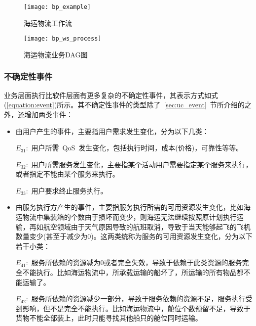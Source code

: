 \begin{figure}[htbp]
    \centering
    \texttt{[image: bp\_example]}
    \caption{海运物流工作流}\label{figure:bp_example}
    \vspace{-1em}
\end{figure}

\begin{figure}[htbp]
    \centering
    \texttt{[image: bp\_ws\_process]}
    \caption{海运物流业务DAG图}\label{figure:bp_ws_process}
    \vspace{-1em}
\end{figure}

\subsubsection{不确定性事件} \label{sec:uc_bp}

业务层面执行比软件层面有更多复杂的不确定性事件，其表示方式如式(\ref{equation:event})所示。其不确定性事件的类型除了~\ref{sec:uc_event}~节所介绍的之外，还增加两类事件：

\begin{itemize}
    
    \item 由用户产生的事件，主要指用户需求发生变化，分为以下几类：
    
    $E_{31}$:~用户所需~QoS~发生变化，包括执行时间，成本(价格)，可靠性等等。
    
    $E_{32}$:~用户所需服务发生变化，主要指某个活动用户需要指定某个服务来执行，或者指定不能由某个服务来执行。

    $E_{33}$:~用户要求终止服务执行。

    \item 由服务执行方产生的事件，主要指服务执行所需的可用资源发生变化，比如海运物流中集装箱的个数由于损坏而变少，则海运无法继续按照原计划执行运输，再如航空领域由于天气原因导致的航班取消，导致于当天能够起飞的飞机数量变少(甚至于减少为0)。这两类统称为服务的可用资源发生变化，分为以下若干小类：
    
    $E_{41}$:~服务所依赖的资源减为0或者完全失效，导致于依赖于此类资源的服务完全不能执行。比如海运物流中，所承载运输的船坏了，所运输的所有物品都不能运输了。
    
    $E_{42}$:~服务所依赖的资源减少一部分，导致于服务依赖的资源不足，服务执行受到影响，但不是完全不能执行。比如海运物流中，舱位个数预留不足，导致于货物不能全部装上，此时只能寻找其他船只的舱位同时运输。
    
    
\end{itemize}

